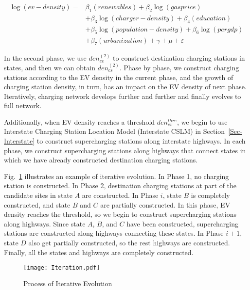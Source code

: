 \documentclass{mcmthesis}
\begin{document}
\begin{equation}\label{Eqn-EVDenCSDen}
\begin{split}
\log(ev-density)= & \beta_{1}(renewables)+\beta_{2}\log(gasprice) \\
  & +\beta_{3}\log(charger-density)+\beta_{4}(education) \\
  & +\beta_{5}\log(population-density)+\beta_{6}\log(pergdp) \\
  & +\beta_{7}(urbanization)+\gamma+\mu+\varepsilon
\end{split}
\end{equation}

In the second phase, we use $den_{ev}^{(2)}$ to construct destination charging stations in states, and then we can obtain $den_{cs}^{(2)}$. Phase by phase, we construct charging stations according to the EV density in the current phase, and the growth of charging station density, in turn, has an impact on the EV density of next phase. Iteratively, charging network develops further and further and finally evolves to full network.

Additionally, when EV density reaches a threshold $den_{ev}^{thre}$, we begin to use Interstate Charging Station Location Model (Interstate CSLM) in Section~\ref{Sec-Interstate} to construct supercharging stations along interstate highways. In each phase, we construct supercharging stations along highways that connect states in which we have already constructed destination charging stations.

Fig.~\ref{Fig-Iteration} illustrates an example of iterative evolution. In Phase 1, no charging station is constructed. In Phase 2, destination charging stations at part of the candidate sites in state $A$ are constructed. In Phase $i$, state $B$ is completely constructed, and state $B$ and $C$ are partially constructed. In this phase, EV density reaches the threshold, so we begin to construct supercharging stations along highways. Since state $A$, $B$, and $C$ have been constructed, supercharging stations are constructed along highways connecting these states. In Phase $i+1$, state $D$ also get partially constructed, so the rest highways are constructed. Finally, all the states and highways are completely constructed.

\begin{figure}[htbp]
  \centering
  \texttt{[image: Iteration.pdf]}
  \caption{Process of Iterative Evolution}\label{Fig-Iteration}
\end{figure}
\end{document}
